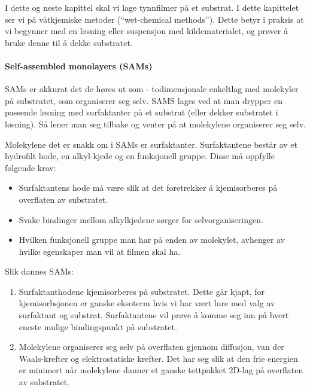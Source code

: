 I dette og neste kapittel skal vi lage tynnfilmer på et substrat. I dette kapittelet ser vi på våtkjemiske metoder (``wet-chemical methods''). Dette betyr i praksis at vi begynner med en løsning eller suspensjon med kildematerialet, og prøver å bruke denne til å dekke substratet.

\paragraph{Self-assembled monolayers (SAMs)} SAMs er akkurat det de høres ut som - todimensjonale enkeltlag med molekyler på substratet, som organiserer seg selv. SAMS lages ved at man drypper en passende løsning med surfaktanter på et substrat (eller dekker substratet i løsning). Så lener man seg tilbake og venter på at molekylene organiserer seg selv. 

Molekylene det er snakk om i SAMs er surfaktanter. Surfaktantene består av et hydrofilt hode, en alkyl-kjede og en funksjonell gruppe. Disse må oppfylle følgende krav:
\begin{itemize}
	\item Surfaktantens hode må være slik at det foretrekker å kjemisorberes på overflaten av substratet. 
	\item Svake bindinger mellom alkylkjedene sørger for selvorganiseringen.
	\item Hvilken funksjonell gruppe man har på enden av molekylet, avhenger av hvilke egenskaper man vil at filmen skal ha. 
\end{itemize}

Slik dannes SAMs:
\begin{enumerate}
	\item Surfaktanthodene kjemisorberes på substratet. Dette går kjapt, for kjemisorbsjonen er ganske eksoterm hvis vi har vært lure med valg av surfaktant og substrat. Surfaktantene vil prøve å komme seg inn på hvert eneste mulige bindingspunkt på substratet.
	\item Molekylene organiserer seg selv på overflaten gjennom diffusjon, van der Waals-krefter og elektrostatiske krefter. Det har seg slik at den frie energien er minimert når molekylene danner et ganske tettpakket 2D-lag på overflaten av substratet.
\end{enumerate}

